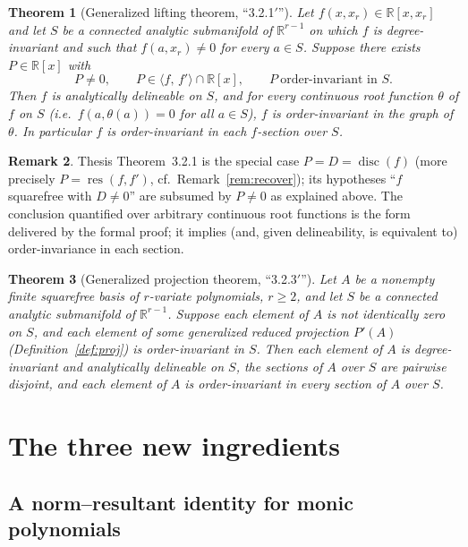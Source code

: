 \documentclass[11pt,a4paper]{article}
\theoremstyle{plain}
\newtheorem{theorem}{Theorem}[section]
\theoremstyle{definition}
\newtheorem{remark}[theorem]{Remark}
\newcommand{\R}{\mathbb{R}}
\DeclareMathOperator{\res}{res}
\DeclareMathOperator{\disc}{disc}
\newcommand{\ideal}[1]{\langle #1\rangle}
\begin{document}
\begin{theorem}[Generalized lifting theorem, ``3.2.1$'$'']\label{thm:lifting}
Let $f(x,x_r)\in\R[x,x_r]$ and let $S$ be a connected analytic submanifold of
$\R^{r-1}$ on which $f$ is degree-invariant and such that $f(a,x_r)\neq 0$ for
every $a\in S$. Suppose there exists $P\in\R[x]$ with
\[
  P\neq 0,\qquad P\in\ideal{f,\,f'}\cap\R[x],\qquad
  P\ \text{order-invariant in } S .
\]
Then $f$ is analytically delineable on $S$, and for every continuous root
function $\theta$ of $f$ on $S$ (i.e.\ $f(a,\theta(a))=0$ for all $a\in S$),
$f$ is order-invariant in the graph of $\theta$. In particular $f$ is
order-invariant in each $f$-section over $S$.
\end{theorem}

\begin{remark}
Thesis Theorem~3.2.1 is the special case $P=D=\disc(f)$ (more precisely
$P=\res(f,f')$, cf.\ Remark~\ref{rem:recover}); its hypotheses ``$f$ squarefree
with $D\neq 0$'' are subsumed by $P\neq 0$ as explained above. The conclusion
quantified over arbitrary continuous root functions is the form delivered by
the formal proof; it implies (and, given delineability, is equivalent to)
order-invariance in each section.
\end{remark}

\begin{theorem}[Generalized projection theorem, ``3.2.3$'$'']\label{thm:projection}
Let $A$ be a nonempty finite squarefree basis of $r$-variate polynomials,
$r\ge 2$, and let $S$ be a connected analytic submanifold of $\R^{r-1}$.
Suppose each element of $A$ is not identically zero on $S$, and each element
of some generalized reduced projection $P'(A)$ (Definition~\ref{def:proj}) is
order-invariant in $S$. Then each element of $A$ is degree-invariant and
analytically delineable on $S$, the sections of $A$ over $S$ are pairwise
disjoint, and each element of $A$ is order-invariant in every section of $A$
over $S$.
\end{theorem}

\section{The three new ingredients}\label{sec:ingredients}

\subsection{A norm--resultant identity for monic polynomials}\label{ssec:norm}
\end{document}
